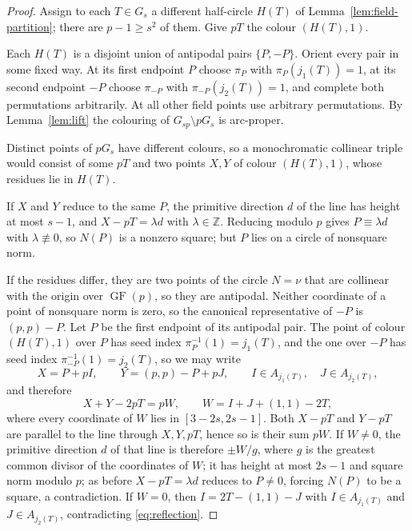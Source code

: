 \documentclass[11pt]{article}
\theoremstyle{definition}
\theoremstyle{remark}
\newcommand{\GF}{\operatorname{GF}}
\newcommand{\Z}{\mathbb{Z}}
\renewcommand{\ge}{\geqslant}
\begin{document}
\begin{proof}
Assign to each \(T\in G_s\) a different half-circle \(H(T)\) of
Lemma~\ref{lem:field-partition}; there are \(p-1\ge s^2\) of them.  Give
\(pT\) the colour \((H(T),1)\).

Each \(H(T)\) is a disjoint union of antipodal pairs \(\{P,-P\}\).  Orient
every pair in some fixed way.  At its first endpoint \(P\) choose
\(\pi_P\) with \(\pi_P(j_1(T))=1\), at its second endpoint \(-P\) choose
\(\pi_{-P}\) with \(\pi_{-P}(j_2(T))=1\), and complete both
permutations arbitrarily.  At all other field points use arbitrary
permutations.  By Lemma~\ref{lem:lift} the colouring of
\(G_{sp}\setminus pG_s\) is arc-proper.

Distinct points of \(pG_s\) have different colours, so a monochromatic
collinear triple would consist of some \(pT\) and two points \(X,Y\) of
colour \((H(T),1)\), whose residues lie in \(H(T)\).

If \(X\) and \(Y\) reduce to the same \(P\), the primitive direction
\(d\) of the line has height at most \(s-1\), and \(X-pT=\lambda d\)
with \(\lambda\in\Z\).  Reducing modulo \(p\) gives \(P\equiv\lambda d\)
with \(\lambda\not\equiv0\), so \(N(P)\) is a nonzero square; but
\(P\) lies on a circle of nonsquare norm.

If the residues differ, they are two points of the circle \(N=\nu\) that
are collinear with the origin over \(\GF(p)\), so they are antipodal.
Neither coordinate of a point of nonsquare norm is zero, so the canonical
representative of \(-P\) is \((p,p)-P\).  Let \(P\) be the first endpoint
of its antipodal pair.  The point of colour \((H(T),1)\) over \(P\) has
seed index \(\pi_P^{-1}(1)=j_1(T)\), and the one over \(-P\) has seed
index \(\pi_{-P}^{-1}(1)=j_2(T)\), so we may write
\[
  X=P+pI,\qquad Y=(p,p)-P+pJ,\qquad I\in A_{j_1(T)},\quad J\in A_{j_2(T)},
\]
and therefore
\begin{equation}\label{eq:absorb-W}
  X+Y-2pT=pW,\qquad W=I+J+(1,1)-2T,
\end{equation}
where every coordinate of \(W\) lies in \([3-2s,2s-1]\).  Both
\(X-pT\) and \(Y-pT\) are parallel to the line through \(X,Y,pT\), hence
so is their sum \(pW\).  If \(W\ne0\), the primitive direction \(d\) of
that line is therefore \(\pm W/g\), where \(g\) is the greatest common
divisor of the coordinates of \(W\); it has height at most \(2s-1\) and
square norm modulo \(p\); as before \(X-pT=\lambda d\) reduces to
\(P\ne0\), forcing \(N(P)\) to be a square, a contradiction.  If
\(W=0\), then \(I=2T-(1,1)-J\) with \(I\in A_{j_1(T)}\) and
\(J\in A_{j_2(T)}\), contradicting \eqref{eq:reflection}.
\end{proof}
\end{document}
